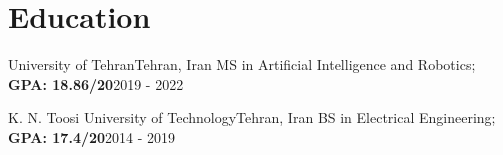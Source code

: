 
\section{Education}

  \resumeSubHeadingListStart
      
      \resumeSubheading
      {University of Tehran}{Tehran, Iran}
      {MS in Artificial Intelligence and Robotics; \textbf{GPA: 18.86/20}}{2019 - 2022}
      \resumeItemListStart
      \resumeItemListEnd

      \resumeSubheading
      {K. N. Toosi University of Technology}{Tehran, Iran}
      {BS in Electrical Engineering; \textbf{GPA: 17.4/20}}{2014 - 2019}
      \resumeItemListStart
      \resumeItemListEnd
    
  \resumeSubHeadingListEnd